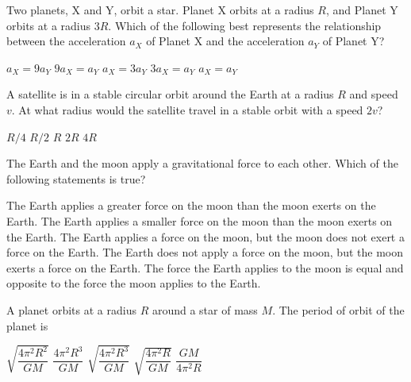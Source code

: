 \documentclass{../../../oss-ap12ibhl-print}
\begin{document}
\begin{questions}
  \question Two planets, X and Y, orbit a star. Planet X orbits at a radius
  $R$, and Planet Y orbits at a radius $3R$. Which of the following best
  represents the relationship between the acceleration $a_X$ of Planet X and the
  acceleration $a_Y$ of Planet Y?
  \begin{center}
  \end{center}
  \begin{choices}
    \choice $a_X = 9a_Y$
    \choice $9a_X = a_Y$
    \choice $a_X = 3a_Y$
    \choice $3a_X = a_Y$
    \choice $a_X = a_Y$
  \end{choices}
    
  \question A satellite is in a stable circular orbit around the Earth at a
  radius $R$ and speed $v$. At what radius would the satellite travel in a
  stable orbit with a speed $2v$?
  \begin{choices}
    \choice $R/4$
    \choice $R/2$
    \choice $R$
    \choice $2R$
    \choice $4R$
  \end{choices}
  
  \question The Earth and the moon apply a gravitational force to each other.
  Which of the following statements is true?
  \begin{choices}
    \choice The Earth applies a greater force on the moon than the moon exerts
    on the Earth.
    \choice The Earth applies a smaller force on the moon than the moon exerts
    on the Earth.
    \choice The Earth applies a force on the moon, but the moon does not exert a
    force on the Earth.
    \choice The Earth does not apply a force on the moon, but the moon exerts a
    force on the Earth.
    \choice The force the Earth applies to the moon is equal and opposite to the
    force the moon applies to the Earth.
  \end{choices}
  \vspace{.7in}

  \question A planet orbits at a radius $R$ around a star of mass $M$. The
  period of orbit of the planet is
  \begin{choices}
    \choice $\sqrt{\dfrac{4\pi^2R^2}{GM}}$
    \choice $\dfrac{4\pi^2R^3}{GM}$
    \choice $\sqrt{\dfrac{4\pi^2R^3}{GM}}$
    \choice $\sqrt{\dfrac{4\pi^2R}{GM}}$
    \choice $\dfrac{GM}{4\pi^2R}$
  \end{choices}
  \newpage
  

\end{questions}
\end{document}
